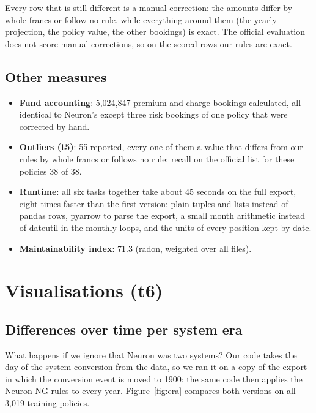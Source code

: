 \documentclass[11pt,a4paper]{article}
\begin{document}
Every row that is still different is a manual correction: the amounts differ by whole francs or follow no rule,
while everything around them (the yearly projection, the policy value, the other bookings) is exact. The official
evaluation does not score manual corrections, so on the scored rows our rules are exact.

\subsection{Other measures}
\begin{itemize}
  \item \textbf{Fund accounting}: 5,024,847 premium and charge bookings calculated, all identical to Neuron's except
        three risk bookings of one policy that were corrected by hand.
  \item \textbf{Outliers (t5)}: 55 reported, every one of them a value that differs from our rules by whole francs
        or follows no rule; recall on the official list for these policies 38 of 38.
  \item \textbf{Runtime}: all six tasks together take about 45 seconds on the full export, eight times faster than
        the first version: plain tuples and lists instead of pandas rows, pyarrow to parse the export, a small month
        arithmetic instead of dateutil in the monthly loops, and the units of every position kept by date.
  \item \textbf{Maintainability index}: 71.3 (radon, weighted over all files).
\end{itemize}

\section{Visualisations (t6)}

\subsection{Differences over time per system era}
What happens if we ignore that Neuron was two systems? Our code takes the day of the system conversion from the data,
so we ran it on a copy of the export in which the conversion event is moved to 1900: the same code then applies the
Neuron NG rules to every year. Figure~\ref{fig:era} compares both versions on all 3,019 training policies.
\end{document}
